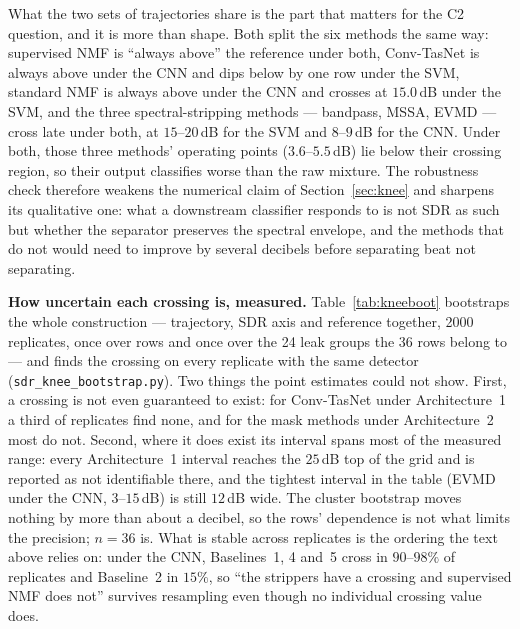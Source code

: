 \documentclass[11pt]{article}
\begin{document}
What the two sets of trajectories share is the part that matters for the
C2 question, and it is more than shape. Both split the six methods the
same way: supervised NMF is ``always above'' the reference under both,
Conv-TasNet is always above under the CNN and dips below by one row under
the SVM, standard NMF is always above under the CNN and crosses at
$15.0$\,dB under the SVM, and the three spectral-stripping methods ---
bandpass, MSSA, EVMD --- cross late under both, at $15$--$20$\,dB for the
SVM and $8$--$9$\,dB for the CNN. Under both, those three methods'
operating points ($3.6$--$5.5$\,dB) lie below their crossing region, so
their output classifies worse than the raw mixture. The robustness check
therefore weakens the numerical claim of Section~\ref{sec:knee} and
sharpens its qualitative one: what a downstream classifier responds to is
not SDR as such but whether the separator preserves the spectral
envelope, and the methods that do not would need to improve by several
decibels before separating beat not separating.

\textbf{How uncertain each crossing is, measured.} Table~\ref{tab:kneeboot}
bootstraps the whole construction --- trajectory, SDR axis and reference
together, 2000 replicates, once over rows and once over the 24 leak
groups the 36 rows belong to --- and finds the crossing on every replicate
with the same detector (\texttt{sdr\_knee\_bootstrap.py}). Two things
the point estimates could not show. First, a crossing is not even
guaranteed to exist: for Conv-TasNet under Architecture~1 a third of
replicates find none, and for the mask methods under Architecture~2 most
do not. Second, where it does exist its interval spans most of the
measured range: every Architecture~1 interval reaches the $25$\,dB top of
the grid and is reported as not identifiable there, and the tightest
interval in the table (EVMD under the CNN, $3$--$15$\,dB) is still
$12$\,dB wide. The cluster bootstrap moves nothing by more than about a
decibel, so the rows' dependence is not what limits the precision;
$n{=}36$ is. What is stable across replicates is the ordering the text
above relies on: under the CNN, Baselines~1, 4 and~5 cross in
$90$--$98\%$ of replicates and Baseline~2 in $15\%$, so ``the strippers
have a crossing and supervised NMF does not'' survives resampling even
though no individual crossing value does.
\end{document}
